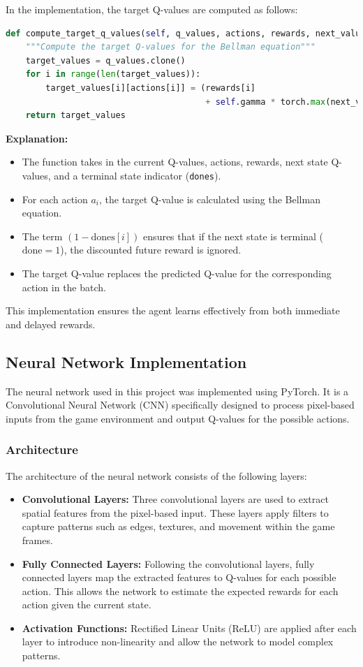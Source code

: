 \documentclass[a4paper,12pt]{article}
\begin{document}
In the implementation, the target Q-values are computed as follows:
\begin{lstlisting}[language=Python, caption=Target Q-values Calculation]
def compute_target_q_values(self, q_values, actions, rewards, next_values, dones):
    """Compute the target Q-values for the Bellman equation"""
    target_values = q_values.clone()
    for i in range(len(target_values)):
        target_values[i][actions[i]] = (rewards[i] 
                                        + self.gamma * torch.max(next_values[i]) * (1 - dones[i]))
    return target_values
\end{lstlisting}

\textbf{Explanation:}
\begin{itemize}
    \item The function takes in the current Q-values, actions, rewards, next state Q-values, and a terminal state indicator (\texttt{dones}).
    \item For each action \(a_i\), the target Q-value is calculated using the Bellman equation.
    \item The term \((1 - \text{dones}[i])\) ensures that if the next state is terminal (\(\text{done} = 1\)), the discounted future reward is ignored.
    \item The target Q-value replaces the predicted Q-value for the corresponding action in the batch.
\end{itemize}

This implementation ensures the agent learns effectively from both immediate and delayed rewards.

\subsection{Neural Network Implementation}

The neural network used in this project was implemented using PyTorch. It is a Convolutional Neural Network (CNN) specifically designed to process pixel-based inputs from the game environment and output Q-values for the possible actions.

\subsubsection{Architecture}
The architecture of the neural network consists of the following layers:
\begin{itemize}
    \item \textbf{Convolutional Layers:} Three convolutional layers are used to extract spatial features from the pixel-based input. These layers apply filters to capture patterns such as edges, textures, and movement within the game frames.
    \item \textbf{Fully Connected Layers:} Following the convolutional layers, fully connected layers map the extracted features to Q-values for each possible action. This allows the network to estimate the expected rewards for each action given the current state.
    \item \textbf{Activation Functions:} Rectified Linear Units (ReLU) are applied after each layer to introduce non-linearity and allow the network to model complex patterns.
\end{itemize}
\end{document}
